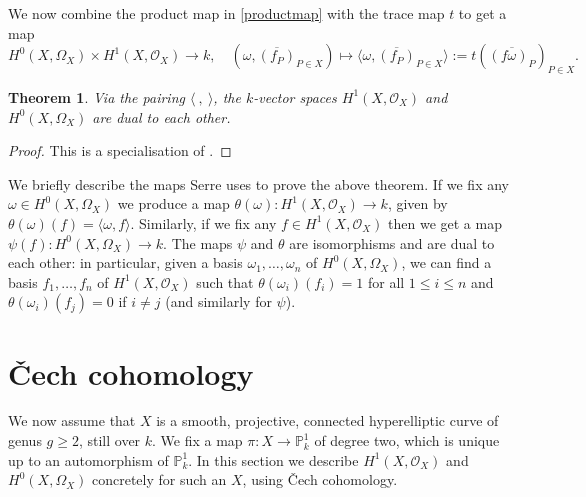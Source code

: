 \documentclass[draft, 11pt]{article} %
\theoremstyle{plain}
\newtheorem{thm}[defn]{Theorem}
\theoremstyle{remark}
\newcommand{\ra}{\rightarrow}
\newcommand{\cech}{\v{C}ech }
\newcommand{\hzero}{{H^0(X,\Omega_X)}}
\newcommand{\hone}{H^1(X,\mathcal{O}_X)}
\begin{document}
We now combine the product map in \eqref{productmap} with the trace map $t$ to get a map 
\[
 \hzero \times \hone \ra k,\quad (\omega, \overline{(f_P)}_{P \in X}) \mapsto \langle \omega, \overline{(f_P)}_{P \in X} \rangle := t \left( \overline{(f \omega)_P} \right)_{P \in X}.
\]

\begin{thm}\label{serredualitytheorem}
Via the pairing $\langle\ ,\ \rangle$, the $k$-vector spaces $\hone$ and $\hzero$ are dual to each other.
\end{thm}
\begin{proof}
This is a specialisation of \cite[Thm. 2, Chap. II]{algebraicgroupsandclassfields}.
\end{proof}

We briefly describe the maps Serre uses to prove the above theorem.
If we fix any $\omega \in \hzero$ we produce a map $\theta(\omega)\colon \hone \ra k$, given by $\theta(\omega)(f) = \langle \omega , f\rangle$.
Similarly, if we fix any $f \in \hone$ then we get a map $\psi(f) \colon \hzero \ra k$.
The maps $\psi$ and $\theta$ are isomorphisms and are dual to each other: in particular, given a basis $\omega_1, \ldots, \omega_n$ of $\hzero$, we can find a basis $f_1, \ldots , f_n$ of $\hone$ such that $\theta(\omega_i)(f_i) = 1$ for all $1 \leq i \leq n$ and $\theta(\omega_i)(f_j) = 0$ if $i \neq j$ (and similarly for $\psi$).


\section{\cech cohomology}
We now assume that $X$ is a smooth, projective, connected hyperelliptic curve of genus $g \geq 2$, still over $k$.
We  fix a map $\pi \colon X \rightarrow \mathbb P_k^1$ of degree two, which is unique up to an automorphism of $\mathbb P_k^1$.
In this section we describe $\hone$ and $\hzero$ concretely for such an $X$, using \cech cohomology.
\end{document}
